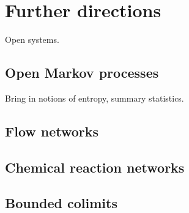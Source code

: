 \chapter{Further directions}

Open systems. 

\section{Open Markov processes}
Bring in notions of entropy, summary statistics. 
\section{Flow networks}

\section{Chemical reaction networks}

\section{Bounded colimits}


